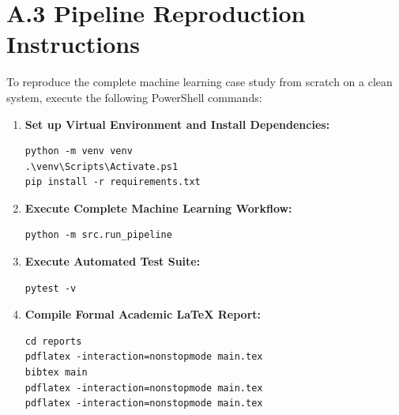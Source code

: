 \section*{A.3 Pipeline Reproduction Instructions}
To reproduce the complete machine learning case study from scratch on a clean system, execute the following PowerShell commands:

\begin{enumerate}
    \item \textbf{Set up Virtual Environment and Install Dependencies:}
\begin{verbatim}
python -m venv venv
.\venv\Scripts\Activate.ps1
pip install -r requirements.txt
\end{verbatim}

    \item \textbf{Execute Complete Machine Learning Workflow:}
\begin{verbatim}
python -m src.run_pipeline
\end{verbatim}

    \item \textbf{Execute Automated Test Suite:}
\begin{verbatim}
pytest -v
\end{verbatim}

    \item \textbf{Compile Formal Academic LaTeX Report:}
\begin{verbatim}
cd reports
pdflatex -interaction=nonstopmode main.tex
bibtex main
pdflatex -interaction=nonstopmode main.tex
pdflatex -interaction=nonstopmode main.tex
\end{verbatim}
\end{enumerate}
